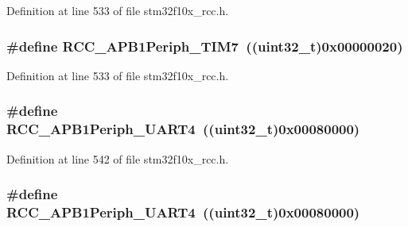 Definition at line 533 of file stm32f10x\+\_\+rcc.\+h.

\subsubsection[{\texorpdfstring{R\+C\+C\+\_\+\+A\+P\+B1\+Periph\+\_\+\+T\+I\+M7}{RCC_APB1Periph_TIM7}}]{\setlength{\rightskip}{0pt plus 5cm}\#define R\+C\+C\+\_\+\+A\+P\+B1\+Periph\+\_\+\+T\+I\+M7~(({\bf uint32\+\_\+t})0x00000020)}\hypertarget{group___a_p_b1__peripheral_ga9415b0c46db5318bdee3f868c16b8d35}{}\label{group___a_p_b1__peripheral_ga9415b0c46db5318bdee3f868c16b8d35}


Definition at line 533 of file stm32f10x\+\_\+rcc.\+h.

\subsubsection[{\texorpdfstring{R\+C\+C\+\_\+\+A\+P\+B1\+Periph\+\_\+\+U\+A\+R\+T4}{RCC_APB1Periph_UART4}}]{\setlength{\rightskip}{0pt plus 5cm}\#define R\+C\+C\+\_\+\+A\+P\+B1\+Periph\+\_\+\+U\+A\+R\+T4~(({\bf uint32\+\_\+t})0x00080000)}\hypertarget{group___a_p_b1__peripheral_ga839d7ae3386622158210ecf53d9cd989}{}\label{group___a_p_b1__peripheral_ga839d7ae3386622158210ecf53d9cd989}


Definition at line 542 of file stm32f10x\+\_\+rcc.\+h.

\subsubsection[{\texorpdfstring{R\+C\+C\+\_\+\+A\+P\+B1\+Periph\+\_\+\+U\+A\+R\+T4}{RCC_APB1Periph_UART4}}]{\setlength{\rightskip}{0pt plus 5cm}\#define R\+C\+C\+\_\+\+A\+P\+B1\+Periph\+\_\+\+U\+A\+R\+T4~(({\bf uint32\+\_\+t})0x00080000)}\hypertarget{group___a_p_b1__peripheral_ga839d7ae3386622158210ecf53d9cd989}{}\label{group___a_p_b1__peripheral_ga839d7ae3386622158210ecf53d9cd989}


